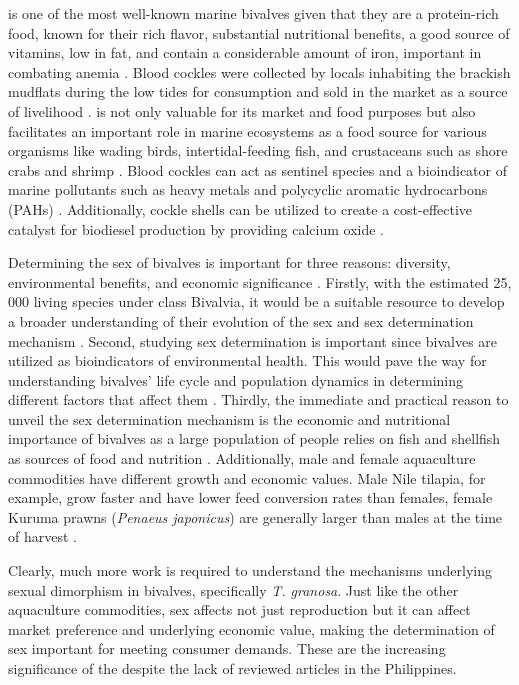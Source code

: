 {\Tgranosa is one of the most well-known marine bivalves given that they are a protein-rich food, known for their rich flavor, substantial nutritional benefits, a good source of vitamins, low in fat, and contain a considerable amount of iron, important in combating anemia \cite{zha2022}. Blood cockles were collected by locals inhabiting the brackish mudflats during the low tides for consumption and sold in the market as a source of livelihood \cite{miranda2023}. \Tgranosa is not only valuable for its market and food purposes but also facilitates an important role in marine ecosystems as a food source for various organisms like wading birds, intertidal-feeding fish, and crustaceans such as shore crabs and shrimp \cite{burdon2014}. Blood cockles can act as sentinel species and a bioindicator of marine pollutants such as heavy metals \cite{ishak2016} and polycyclic aromatic hydrocarbons (PAHs) \cite{sany2014}. Additionally, cockle shells can be utilized to create a cost-effective catalyst for biodiesel production by providing calcium oxide \cite{boey2011waste}.

Determining the sex of bivalves is important for three reasons: diversity, environmental benefits, and economic significance \cite{breton2010novel}. Firstly, with the estimated 25, 000 living species under class Bivalvia, it would be a suitable resource to develop a broader understanding of their evolution of the sex and sex determination mechanism  \cite{breton2010novel}. Second, studying sex determination is important since bivalves are utilized as bioindicators of environmental health. This would pave the way for understanding bivalves' life cycle and population dynamics in determining different factors that affect them \cite{campos2012}. Thirdly, the immediate and practical reason to unveil the sex determination mechanism is the economic and nutritional importance of bivalves as a large population of people relies on fish and shellfish as sources of food and nutrition \cite{naylor2000}. Additionally, male and female aquaculture commodities have different growth and economic values. Male Nile tilapia, for example, grow faster and have lower feed conversion rates than females, female Kuruma prawns (\textit{Penaeus japonicus}) are generally larger than males at the time of harvest \cite{budd}. 

Clearly, much more work is required to understand the mechanisms underlying sexual dimorphism in bivalves, specifically \textit{T. granosa}. Just like the other aquaculture commodities, sex affects not just reproduction but it can affect market preference and underlying economic value, making the determination of sex important for meeting consumer demands. These are the increasing significance of the \Tgranosa despite the lack of reviewed articles in the Philippines.

}
